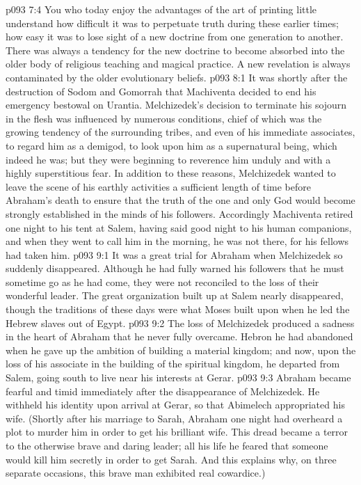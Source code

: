 \vs p093 7:4 \pc You who today enjoy the advantages of the art of printing little understand how difficult it was to perpetuate truth during these earlier times; how easy it was to lose sight of a new doctrine from one generation to another. There was always a tendency for the new doctrine to become absorbed into the older body of religious teaching and magical practice. A new revelation is always contaminated by the older evolutionary beliefs.
\vs p093 8:1 It was shortly after the destruction of Sodom and Gomorrah that Machiventa decided to end his emergency bestowal on Urantia. Melchizedek’s decision to terminate his sojourn in the flesh was influenced by numerous conditions, chief of which was the growing tendency of the surrounding tribes, and even of his immediate associates, to regard him as a demigod, to look upon him as a supernatural being, which indeed he was; but they were beginning to reverence him unduly and with a highly superstitious fear. In addition to these reasons, Melchizedek wanted to leave the scene of his earthly activities a sufficient length of time before Abraham’s death to ensure that the truth of the one and only God would become strongly established in the minds of his followers. Accordingly Machiventa retired one night to his tent at Salem, having said good night to his human companions, and when they went to call him in the morning, he was not there, for his fellows had taken him.
\vs p093 9:1 It was a great trial for Abraham when Melchizedek so suddenly disappeared. Although he had fully warned his followers that he must sometime go as he had come, they were not reconciled to the loss of their wonderful leader. The great organization built up at Salem nearly disappeared, though the traditions of these days were what Moses built upon when he led the Hebrew slaves out of Egypt.
\vs p093 9:2 \pc The loss of Melchizedek produced a sadness in the heart of Abraham that he never fully overcame. Hebron he had abandoned when he gave up the ambition of building a material kingdom; and now, upon the loss of his associate in the building of the spiritual kingdom, he departed from Salem, going south to live near his interests at Gerar.
\vs p093 9:3 Abraham became fearful and timid immediately after the disappearance of Melchizedek. He withheld his identity upon arrival at Gerar, so that Abimelech appropriated his wife. (Shortly after his marriage to Sarah, Abraham one night had overheard a plot to murder him in order to get his brilliant wife. This dread became a terror to the otherwise brave and daring leader; all his life he feared that someone would kill him secretly in order to get Sarah. And this explains why, on three separate occasions, this brave man exhibited real cowardice.)
